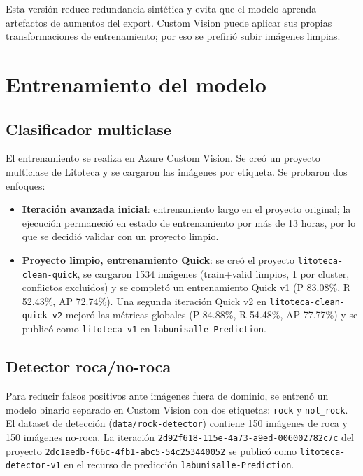 Esta versión reduce redundancia sintética y evita que el modelo aprenda artefactos
de aumentos del export. Custom Vision puede aplicar sus propias transformaciones de
entrenamiento; por eso se prefirió subir imágenes limpias.

\section{Entrenamiento del modelo}

\subsection{Clasificador multiclase}

El entrenamiento se realiza en Azure Custom Vision. Se creó un proyecto multiclase
de Litoteca y se cargaron las imágenes por etiqueta. Se probaron dos enfoques:

\begin{itemize}
  \item \textbf{Iteración avanzada inicial}: entrenamiento largo en el proyecto
        original; la ejecución permaneció en estado de entrenamiento por más de 13
        horas, por lo que se decidió validar con un proyecto limpio.
  \item \textbf{Proyecto limpio, entrenamiento Quick}: se creó el proyecto
        \texttt{litoteca-clean-quick}, se cargaron 1534 imágenes (train+valid
        limpios, 1 por cluster, conflictos excluidos) y se completó un entrenamiento
        Quick v1 (P 83.08\%, R 52.43\%, AP 72.74\%). Una segunda iteración Quick v2
        en \texttt{litoteca-clean-quick-v2} mejoró las métricas globales (P 84.88\%,
        R 54.48\%, AP 77.77\%) y se publicó como \texttt{litoteca-v1} en
        \texttt{labunisalle-Prediction}.
\end{itemize}

\subsection{Detector roca/no-roca}

Para reducir falsos positivos ante imágenes fuera de dominio, se entrenó un modelo
binario separado en Custom Vision con dos etiquetas: \texttt{rock} y
\texttt{not\_rock}. El dataset de detección (\texttt{data/rock-detector}) contiene
150 imágenes de roca y 150 imágenes no-roca. La iteración
\texttt{2d92f618-115e-4a73-a9ed-006002782c7c} del proyecto
\texttt{2dc1aedb-f66c-4fb1-abc5-54c253440052} se publicó como
\texttt{litoteca-detector-v1} en el recurso de predicción
\texttt{labunisalle-Prediction}.

